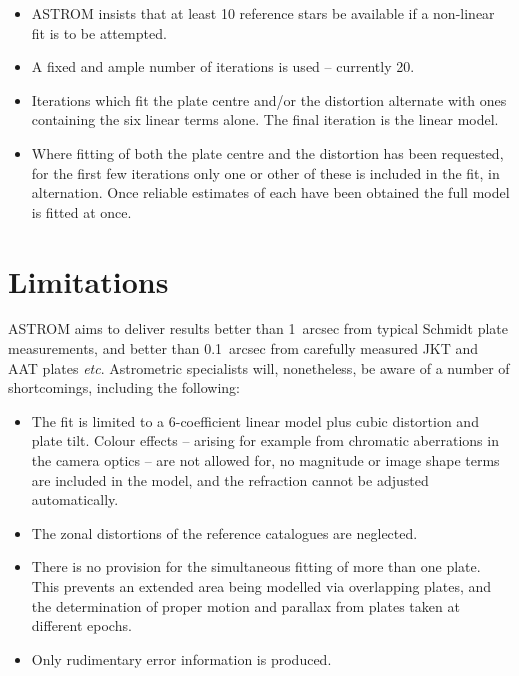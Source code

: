 \documentclass[twoside,11pt]{article}
\newcommand{\xlabel}[1]{}
\renewcommand{\_}{\texttt{\symbol{95}}}
\begin{document}
\begin{itemize}

\item ASTROM insists that at least 10 reference stars be available
   if a non-linear fit is to be attempted.

\item A fixed and ample number of iterations is used -- currently 20.

\item Iterations which fit the plate centre and/or the distortion
   alternate with ones containing the six linear terms alone.  The final
   iteration is the linear model.

\item Where fitting of both the plate centre and the distortion has been
   requested, for the first few iterations only one or other of these
   is included in the fit, in alternation.  Once reliable estimates of
   each have been obtained the full model is fitted at once.

\end{itemize}

\section{\xlabel{limitation}Limitations}
\label{limitations}

ASTROM aims to deliver results better than 1~arcsec from typical Schmidt
plate measurements, and better than 0.1~arcsec from carefully measured
JKT and AAT plates \emph{etc}.  Astrometric specialists will, nonetheless,
be aware of a number of shortcomings, including the following:

\begin{itemize}

   \item The fit is limited to a 6-coefficient linear model plus cubic
      distortion and plate tilt.  Colour effects -- arising for example
      from chromatic aberrations in the camera optics -- are not allowed
      for, no magnitude or image shape terms are included in the model,
      and the refraction cannot be adjusted automatically.  

   \item The zonal distortions of the reference catalogues are neglected.

   \item There is no provision for the simultaneous fitting of more
      than one plate.  This prevents an extended area being modelled
      via overlapping plates, and the determination of proper motion
      and parallax from plates taken at different epochs.

   \item Only rudimentary error information is produced.

\end{itemize}
\end{document}
